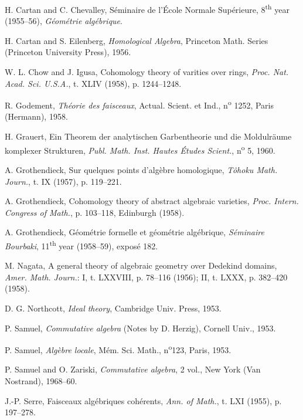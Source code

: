 
\label{bib-section}

\begin{thebibliography}{22}
H. Cartan and C. Chevalley,
S\'eminaire de l'\'Ecole Normale Sup\'erieure,
8\textsuperscript{th} year (1955--56),
\emph{G\'eom\'etrie alg\'ebrique}.

H. Cartan and S. Eilenberg,
\emph{Homological Algebra},
Princeton Math. Series (Princeton University Press),
1956.

W. L. Chow and J. Igusa,
Cohomology theory of varities over rings,
\emph{Proc. Nat. Acad. Sci. U.S.A.},
t. XLIV (1958),
p. 1244--1248.

R. Godement,
\emph{Th\'eorie des faisceaux},
Actual. Scient. et Ind.,
n\textsuperscript{o} 1252,
Paris (Hermann),
1958.

H. Grauert,
Ein Theorem der analytischen Garbentheorie und die Moldulr\"aume komplexer Strukturen,
\emph{Publ. Math. Inst. Hautes \'Etudes Scient.},
n\textsuperscript{o} 5,
1960.

A. Grothendieck,
Sur quelques points d'alg\`ebre homologique,
\emph{T\^ohoku Math. Journ.},
t. IX (1957),
p. 119--221.

A. Grothendieck,
Cohomology theory of abstract algebraic varieties,
\emph{Proc. Intern. Congress of Math.},
p. 103--118,
Edinburgh (1958).

A. Grothendieck,
G\'eom\'etrie formelle et g\'eom\'etrie alg\'ebrique,
\emph{S\'eminaire Bourbaki},
11\textsuperscript{th} year (1958--59),
expos\'e 182.

M. Nagata,
A general theory of algebraic geometry over Dedekind domains,
\emph{Amer. Math. Journ.}:
I,
t. LXXVIII,
p. 78--116 (1956);
II,
t. LXXX,
p. 382--420 (1958).

D. G. Northcott,
\emph{Ideal theory},
Cambridge Univ. Press,
1953.

P. Samuel,
\emph{Commutative algebra} (Notes by D. Herzig),
Cornell Univ.,
1953.

P. Samuel,
\emph{Alg\`ebre locale},
M\'em. Sci. Math.,
n\textsuperscript{o}123,
Paris,
1953.

P. Samuel and O. Zariski,
\emph{Commutative algebra},
2 vol.,
New York (Van Nostrand),
1968--60.

J.-P. Serre,
Faisceaux alg\'ebriques coh\'erents,
\emph{Ann. of Math.},
t. LXI (1955),
p. 197--278.


\end{thebibliography}
